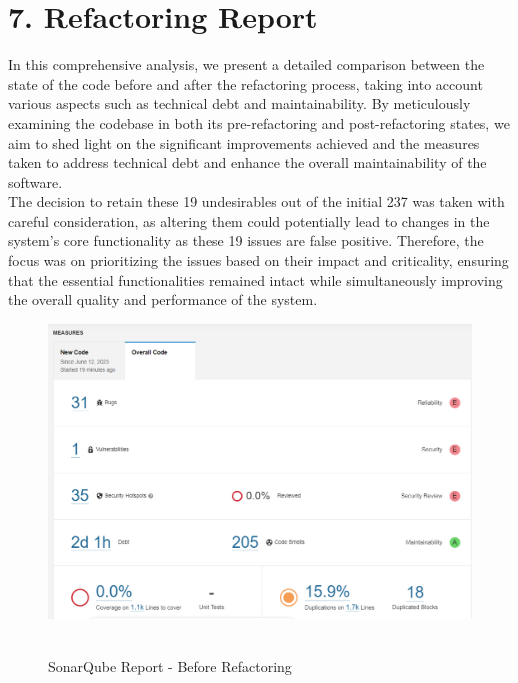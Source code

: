 \documentclass[12pt,letterpaper]{report}
\begin{document}
\pagebreak

\section*{7. Refactoring Report}

\normalsize{
In this comprehensive analysis, we present a detailed comparison between the state of the code before and after the refactoring process, taking into account various aspects such as technical debt and maintainability. By meticulously examining the codebase in both its pre-refactoring and post-refactoring states, we aim to shed light on the significant improvements achieved and the measures taken to address technical debt and enhance the overall maintainability of the software.\\

The decision to retain these 19 undesirables out of the initial 237 was taken with careful consideration, as altering them could potentially lead to changes in the system's core functionality as these 19 issues are false positive. Therefore, the focus was on prioritizing the issues based on their impact and criticality, ensuring that the essential functionalities remained intact while simultaneously improving the overall quality and performance of the system.\\

\begin{figure}[h!]
    \centering
    \includegraphics[width=0.9\linewidth]{Images/sonar_report.png}\
    \caption{SonarQube Report - Before Refactoring}
    \label{fig:enter-label}
\end{figure}

}
\end{document}
